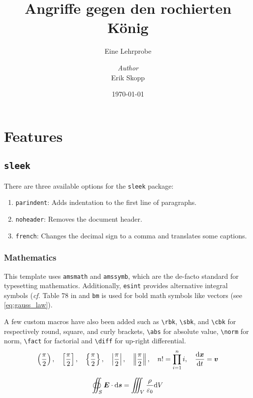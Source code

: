 \documentclass[a4paper, 12pt]{report}
\institute{Deutscher Schachbund}
\title{Angriffe gegen den rochierten König}
\subtitle{Eine Lehrprobe}
\author{\textit{Author}\\ Erik Skopp}
\date{\today}
\def\tbs{\textbackslash}
\begin{document}
    \maketitle
    \romantableofcontents

   
\chapter{Features}

\section{\texttt{sleek}}

There are three available options for the \texttt{sleek} package:

\begin{enumerate}[noitemsep]
	\item \texttt{parindent}: Adds indentation to the first line of paragraphs.
	\item \texttt{noheader}: Removes the document header.
	\item \texttt{french}: Changes the decimal sign to a comma and translates some captions.
\end{enumerate}


\subsection{Mathematics}

This template uses \texttt{amsmath} and \texttt{amssymb}, which are the de-facto standard for typesetting mathematics. Additionally, \texttt{esint} provides alternative integral symbols (\emph{cf.} Table 78 in and \texttt{bm} is used for bold math symbols like vectors (see \eqref{eq:gauss_law}).

A few custom macros have also been added such as \texttt{\tbs{}rbk}, \texttt{\tbs{}sbk}, and \texttt{\tbs{}cbk} for respectively round, square, and curly brackets, \texttt{\tbs{}abs} for absolute value, \texttt{\tbs{}norm} for norm, \texttt{\tbs{}fact} for factorial and \texttt{\tbs{}diff} for up-right differential.
$$
\left(\frac{\pi}{2}\right), \quad \left[\frac{\pi}{2}\right], \quad \left\{\frac{\pi}{2}\right\}, \quad \left|\frac{\pi}{2}\right|, \quad \left\|\frac{\pi}{2}\right\|, \quad n! = \prod_{i = 1}^{n} i, \quad \frac{\mathrm{d} \bm{x}}{\mathrm{d} t} = \bm{v}
$$

\begin{equation}\label{eq:gauss_law}
	\oiint_S \bm{E} \cdot \mathrm{d} \bm{s} = \iiint_V \frac{\rho}{\varepsilon_0} \mathrm{d} V
\end{equation}
\end{document}
